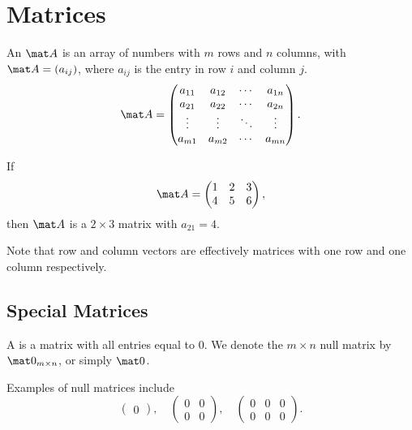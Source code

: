 \chapter{Matrices}

\begin{definition}
    An  $\mat A$ is an array of numbers with $m$ rows and $n$ columns, with $\mat A = (a_{ij})$, where $a_{ij}$ is the entry in row $i$ and column $j$. \[\mat A = \begin{pmatrix}a_{11} & a_{12} & \cdots & a_{1n} \\ a_{21} & a_{22} & \cdots & a_{2n} \\ \vdots & \vdots & \ddots & \vdots \\ a_{m1} & a_{m2} & \cdots & a_{mn} \end{pmatrix}.\]
\end{definition}

\begin{example}
    If \[\mat A = \begin{pmatrix}1 & 2 & 3 \\ 4 & 5 & 6\end{pmatrix},\] then $\mat A$ is a $2 \times 3$ matrix with $a_{21} = 4$.
\end{example}

Note that row and column vectors are effectively matrices with one row and one column respectively.

\section{Special Matrices}

\begin{definition}
    A  is a matrix with all entries equal to 0. We denote the $m \times n$ null matrix by $\mat 0_{m \times n}$, or simply $\mat 0$.
\end{definition}

\begin{example}
    Examples of null matrices include \[\begin{pmatrix}0\end{pmatrix}, \quad \begin{pmatrix}0 & 0 \\ 0 & 0\end{pmatrix}, \quad \begin{pmatrix}0 & 0 & 0 \\ 0 & 0 & 0\end{pmatrix}.\]
\end{example}

